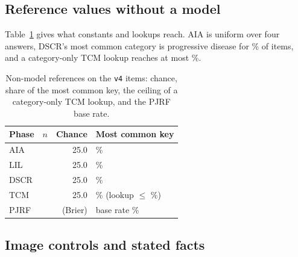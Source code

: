\documentclass[11pt]{article}
\begin{document}
\subsection{Reference values without a model}

Table~\ref{tab:baselines} gives what constants and lookups reach. AIA is uniform over four answers, DSCR's most common category is progressive disease for \vfourMajorityDSCR{}\% of items, and a category-only TCM lookup reaches at most \vfourTcmLookupConf{}\%.

\begin{table}[t]
\centering
\footnotesize
\setlength{\tabcolsep}{3pt}
\begin{tabular}{lrrl}
\toprule
Phase & $n$ & Chance & Most common key \\
\midrule
AIA & \vfourNAIA{} & 25.0 & \vfourMajorityAIA{}\% \\
LIL & \vfourNLIL{} & 25.0 & \vfourMajorityLIL{}\% \\
DSCR & \vfourNDSCR{} & 25.0 & \vfourMajorityDSCR{}\% \\
TCM & \vfourNTCM{} & 25.0 & \vfourMajorityTCM{}\% (lookup $\le$ \vfourTcmLookupConf{}\%) \\
PJRF & \vfourNPJRF{} & (Brier) & base rate \vfourPjrfBase{}\% \\
\bottomrule
\end{tabular}
\caption{Non-model references on the \texttt{v4} items: chance, share of the most common key, the ceiling of a category-only TCM lookup, and the PJRF base rate.}
\label{tab:baselines}
\end{table}

\subsection{Image controls and stated facts}

\ifnum{}
\fi

\begin{table}[t]
\centering
\footnotesize
\setlength{\tabcolsep}{3pt}

\caption{E1: accuracy (\%) with the image and with text only, with no upstream context, and the paired difference in percentage points. AIA is the positive control.}
\label{tab:e1}
\end{table}
\end{document}
